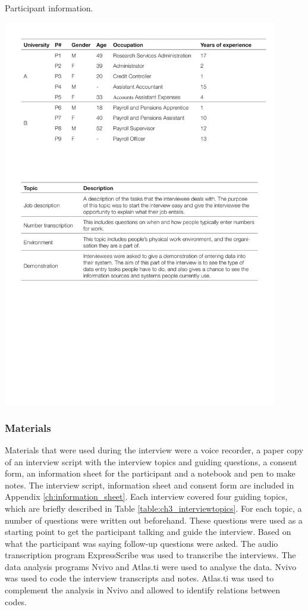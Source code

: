 \begin{table}
\caption{Participant information.}
\centering
\includegraphics[width=0.9\textwidth]{images/ch12/ch12_participants.pdf}
\vspace{-3pt}
\label{tbl:ch12-Table1}
\end{table}

\subsubsection{Materials}
Materials that were used during the interview were a voice recorder, a paper copy of an interview script with the interview topics and guiding questions, a consent form, an information sheet for the participant and a notebook and pen to make notes. The interview script, information sheet and consent form are included in Appendix \ref{ch:information_sheet}.
Each interview covered four guiding topics, which are briefly described in Table \ref{table:ch3_interviewtopics}. For each topic, a number of questions were written out beforehand. These questions were used as a starting point to get the participant talking and guide the interview. Based on what the participant was saying follow-up questions were asked. The audio transcription program ExpressScribe was used to transcribe the interviews. The data analysis programs Nvivo and Atlas.ti were used to analyse the data. Nvivo was used to code the interview transcripts and notes. Atlas.ti was used to complement the analysis in Nvivo and allowed to identify relations between codes.

